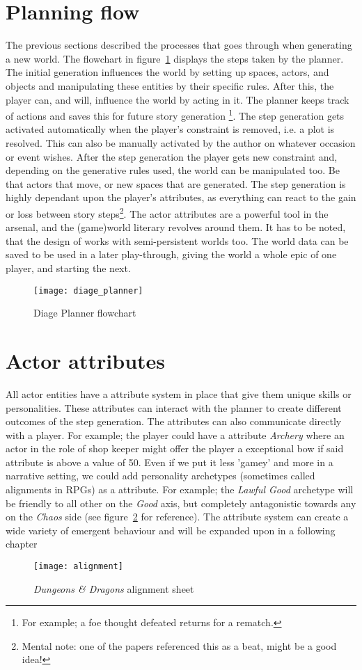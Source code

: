 \section{Planning flow}
The previous sections described the processes that \diage goes through when generating a new world. The flowchart in figure~\ref{fig:diage_flowchart} displays the steps taken by the planner. The initial generation influences the world by setting up spaces, actors, and objects and manipulating these entities by their specific rules. After this, the player can, and will, influence the world by acting in it. The planner keeps track of \his actions and saves this for future story generation \footnote{For example; a foe thought defeated returns for a rematch.}. The step generation gets activated automatically when the player's constraint is removed, i.e. a plot is resolved. This can also be manually activated by the author on whatever occasion or event \he wishes. After the step generation the player gets \his new constraint and, depending on the generative rules used, the world can be manipulated too. Be that actors that move, or new spaces that are generated. The step generation is highly dependant upon the player's attributes, as everything can react to the gain or loss between story steps\footnote{Mental note: one of the papers referenced this as a beat, might be a good idea!}. The actor attributes are a powerful tool in the \diage arsenal, and the (game)world literary revolves around them.
It has to be noted, that the design of \diage works with semi-persistent worlds too. The world data can be saved to be used in a later play-through, giving the world a whole epic of one player, and starting the next. 
\begin{figure}[p]
\texttt{[image: diage\_planner]}
\caption{Diage Planner flowchart}\label{fig:diage_flowchart}
\end{figure}

\section{Actor attributes}
All actor entities have a attribute system in place that give them unique skills or personalities. These attributes can interact with the planner to create different outcomes of the step generation. The attributes can also communicate directly with a player. For example; the player could have a attribute \textit{Archery} where an actor in the role of shop keeper might offer the player a exceptional bow if said attribute is above a value of 50. Even if we put it less 'gamey' and more in a narrative setting, we could add personality archetypes (sometimes called alignments in RPGs) as a attribute. For example; the \textit{Lawful Good} archetype will be friendly to all other on the \textit{Good} axis, but completely antagonistic towards any on the \textit{Chaos} side (see figure~\ref{fig:dnd} for reference).
The attribute system can create a wide variety of emergent behaviour and will be expanded upon in a following chapter~\citationneeded
\begin{figure}[p]
	\texttt{[image: alignment]}
	\caption{\textit{Dungeons \& Dragons} alignment sheet}\label{fig:dnd}
\end{figure}